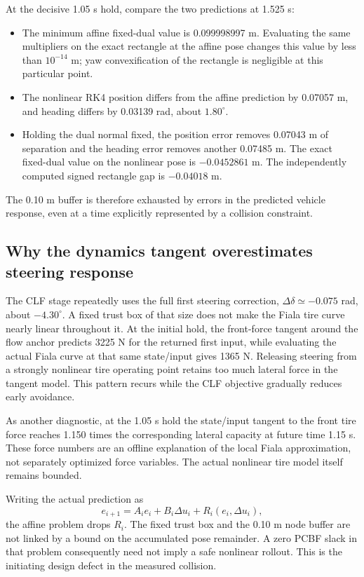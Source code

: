 \documentclass[11pt]{article}
\begin{document}
At the decisive 1.05 s hold, compare the two predictions at 1.525 s:
\begin{itemize}
\item The minimum affine fixed-dual value is 0.099998997 m. Evaluating the
same multipliers on the exact rectangle at the affine pose changes this
value by less than $10^{-14}$ m; yaw convexification of the rectangle is
negligible at this particular point.
\item The nonlinear RK4 position differs from the affine prediction by
0.07057 m, and heading differs by 0.03139 rad, about $1.80^\circ$.
\item Holding the dual normal fixed, the position error removes 0.07043 m
of separation and the heading error removes another 0.07485 m. The exact
fixed-dual value on the nonlinear pose is $-0.0452861$ m. The independently
computed signed rectangle gap is $-0.04018$ m.
\end{itemize}
The 0.10 m buffer is therefore exhausted by errors in the predicted vehicle
response, even at a time explicitly represented by a collision constraint.

\subsection{Why the dynamics tangent overestimates steering response}
The CLF stage repeatedly uses the full first steering correction,
$\Delta\delta\simeq-0.075$ rad, about $-4.30^\circ$. A fixed trust box of
that size does not make the Fiala tire curve nearly linear throughout it.
At the initial hold, the front-force tangent around the flow anchor predicts
3225 N for the returned first input, while evaluating the actual Fiala curve
at that same state/input gives 1365 N. Releasing steering from a strongly
nonlinear tire operating point retains too much lateral force in the tangent
model. This pattern recurs while the CLF objective gradually reduces early
avoidance.

As another diagnostic, at the 1.05 s hold the state/input tangent to the
front tire force reaches 1.150 times the corresponding lateral capacity at
future time 1.15 s. These force numbers are an offline explanation of the
local Fiala approximation, not separately optimized force variables. The
actual nonlinear tire model itself remains bounded.

Writing the actual prediction as
\[
 e_{i+1}=A_i e_i+B_i\Delta u_i+R_i(e_i,\Delta u_i),
\]
the affine problem drops $R_i$. The fixed trust box and the 0.10 m node
buffer are not linked by a bound on the accumulated pose remainder. A zero
PCBF slack in that problem consequently need not imply a safe nonlinear
rollout. This is the initiating design defect in the measured collision.
\end{document}
